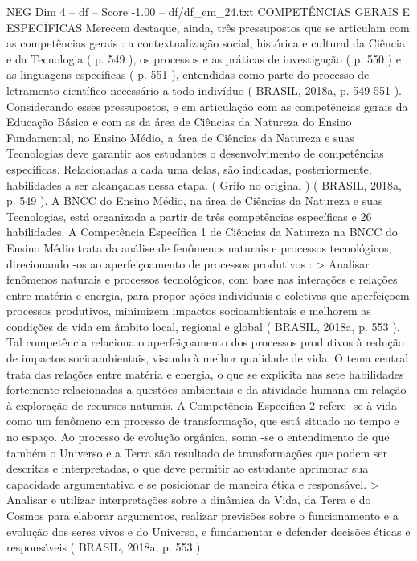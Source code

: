 \begin{textsample}{NEG Dim 4 – df – Score -1.00 – df/df\_em\_24.txt}  \label{ex:f4_neg_069}
COMPETÊNCIAS GERAIS E ESPECÍFICAS Merecem destaque, ainda, três pressupostos que se articulam com as competências gerais : a contextualização social, histórica e cultural da Ciência e da Tecnologia ( p. 549 ), os processos e as práticas de investigação ( p. 550 ) e as linguagens específicas ( p. 551 ), entendidas como parte do processo de letramento científico necessário a todo indivíduo ( BRASIL, 2018a, p. 549-551 ).
Considerando esses pressupostos, e em articulação com as competências gerais da Educação Básica e com as da área de Ciências da Natureza do Ensino Fundamental, no Ensino Médio, a área de Ciências da Natureza e suas Tecnologias deve garantir aos estudantes o desenvolvimento de competências específicas.
Relacionadas a cada uma delas, são indicadas, posteriormente, habilidades a ser alcançadas nessa etapa. ( Grifo no original ) ( BRASIL, 2018a, p. 549 ).
A BNCC do Ensino Médio, na área de Ciências da Natureza e suas Tecnologias, está organizada a partir de três competências específicas e 26 habilidades.
A Competência Específica 1 de Ciências da Natureza na BNCC do Ensino Médio trata da análise de fenômenos naturais e processos tecnológicos, direcionando -os ao aperfeiçoamento de processos produtivos : > Analisar fenômenos naturais e processos tecnológicos, com base nas interações e relações entre matéria e energia, para propor ações individuais e coletivas que aperfeiçoem processos produtivos, minimizem impactos socioambientais e melhorem as condições de vida em âmbito local, regional e global ( BRASIL, 2018a, p. 553 ).
Tal competência relaciona o aperfeiçoamento dos processos produtivos à redução de impactos socioambientais, visando à melhor qualidade de vida.
O tema central trata das relações entre matéria e energia, o que se explicita nas sete habilidades fortemente relacionadas a questões ambientais e da atividade humana em relação à exploração de recursos naturais.
A Competência Específica 2 refere -se à vida como um fenômeno em processo de transformação, que está situado no tempo e no espaço.
Ao processo de evolução orgânica, soma -se o entendimento de que também o Universo e a Terra são resultado de transformações que podem ser descritas e interpretadas, o que deve permitir ao estudante aprimorar sua capacidade argumentativa e se posicionar de maneira ética e responsável. > Analisar e utilizar interpretações sobre a dinâmica da Vida, da Terra e do Cosmos para elaborar argumentos, realizar previsões sobre o funcionamento e a evolução dos seres vivos e do Universo, e fundamentar e defender decisões éticas e responsáveis ( BRASIL, 2018a, p. 553 ).

\end{textsample}
